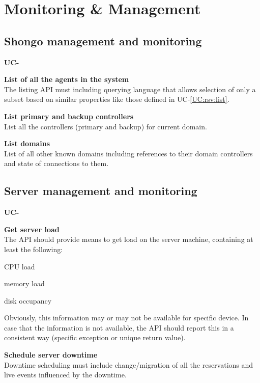 \documentclass[a4paper]{report}
\makeatletter
\newcounter{UCcounter}
\newenvironment{UseCases}%
	{\begin{list}{\textbf{UC-\arabic{UCcounter}}}{\@nmbrlisttrue\def\@listctr{UCcounter}}}%
	{\end{list}}
\newcommand{\UClabel}[1]{\label{UC:#1}}
\newcommand{\UCref}[1]{UC-\ref{UC:#1}}
\newcommand{\UseCase}[2]{\item\UClabel{#2} \textbf{#1}\\}
\makeatother
\begin{document}
\section{Monitoring \& Management}

\subsection{Shongo management and monitoring}

\begin{UseCases}

\UseCase{List of all the agents in the system}{mgmt:shng:list-agents}

The listing API must including querying language that allows selection of only
a subset based on similar properties like those defined in \UCref{rsv:list}.

\UseCase{List primary and backup controllers}{mgmt:shng:list-controllers}

List all the controllers (primary and backup) for current domain.

\UseCase{List domains}{mgmt:shng:list-domains}

List of all other known domains including references to their domain
controllers and state of connections to them.

\end{UseCases}

\subsection{Server management and monitoring}

\begin{UseCases}

\UseCase{Get server load}{mgmt:srv:get-load}

The API should provide means to get load on the server machine, containing at
least the following:

\begin{compactitem}

\item CPU load

\item memory load

\item disk occupancy

\end{compactitem}

Obviously, this information may or may not be available for specific device.
In case that the information is not available, the API should report this in a
consistent way (specific exception or unique return value).


\UseCase{Schedule server downtime}{mgmt:srv:schedule-downtime}

Downtime scheduling must include change/migration of all the reservations and
live events influenced by the downtime.


\end{UseCases}
\end{document}

